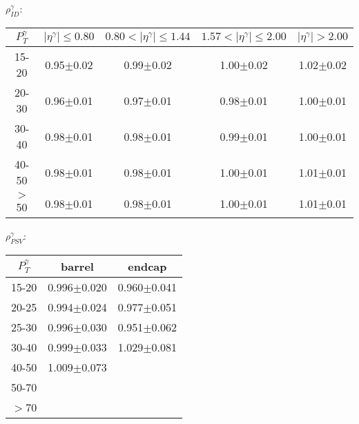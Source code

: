 \begin{frame}
{\begin{center}$\rho^{\gamma}_{ID}$: \end{center}}
\begin{table}[h]
  \tiny
  \begin{center}
   \begin{tabular}{|c|c|c|c|c|}
\hline
 $P_T^{\gamma}$  & $|\eta^{\gamma}|\leq 0.80$ & $0.80<|\eta^{\gamma}|\leq 1.44$ & $1.57<|\eta^{\gamma}|\leq 2.00$ & $|\eta^{\gamma}|> 2.00$\\ \hline
15-20          & 0.95$\pm$0.02   & 0.99$\pm$0.02        & 1.00$\pm$0.02        & 1.02$\pm$0.02 \\ \hline
20-30          & 0.96$\pm$0.01   & 0.97$\pm$0.01        & 0.98$\pm$0.01        & 1.00$\pm$0.01 \\ \hline
30-40          & 0.98$\pm$0.01   & 0.98$\pm$0.01        & 0.99$\pm$0.01        & 1.00$\pm$0.01 \\ \hline
40-50          & 0.98$\pm$0.01   & 0.98$\pm$0.01        & 1.00$\pm$0.01        & 1.01$\pm$0.01 \\ \hline
$>$50          & 0.98$\pm$0.01   & 0.98$\pm$0.01        & 1.00$\pm$0.01        & 1.01$\pm$0.01 \\ \hline
  \end{tabular}
  \label{tab:SFs_PhotonID}
  \end{center}
\end{table}

{\begin{center}$\rho^{\gamma}_{PSV}$: \end{center}}
\begin{table}[h]
  \tiny
  \begin{center}
   \begin{tabular}{|c|c|c|}
\hline
 $P_T^{\gamma}$  & barrel              & endcap \\ \hline
15-20          & 0.996$\pm$0.020     & 0.960$\pm$0.041 \\ \hline
20-25          & 0.994$\pm$0.024     & 0.977$\pm$0.051 \\ \hline
25-30          & 0.996$\pm$0.030     & 0.951$\pm$0.062 \\ \hline
30-40          & 0.999$\pm$0.033     & 1.029$\pm$0.081 \\ \hline
40-50          & 1.009$\pm$0.073     & {\bfseries\color{blue}{0.971$\pm$0.150}} \\ \hline
50-70          & {\bfseries\color{blue}{0.993$\pm$0.128}}     & {\bfseries\color{blue}{0.965$\pm$0.294}} \\ \hline
$>$70          & {\bfseries\color{blue}{1.047$\pm$0.111}}     & {\bfseries\color{blue}{1.145$\pm$0.371}} \\ \hline

  \end{tabular}
  \label{tab:SFs_PhotonPixelSeedVeto}
  \end{center}
\end{table}


\end{frame}%
